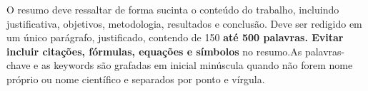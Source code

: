 
\begin{resumoutfpr}%
O resumo deve ressaltar de forma sucinta o conteúdo do trabalho, incluindo justificativa, objetivos, metodologia, resultados e conclusão. Deve ser redigido em um único parágrafo, justificado, contendo de 150 \textbf{até 500 palavras. Evitar incluir citações, fórmulas, equações e símbolos} no resumo.As palavras-chave e as keywords são grafadas em inicial minúscula quando não forem nome próprio ou nome científico e separados por ponto e vírgula.

\end{resumoutfpr}

